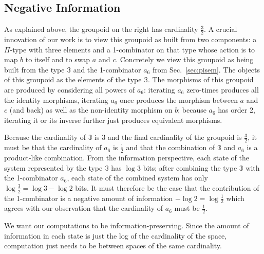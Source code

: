 \subsection{Negative Information}

As explained above, the groupoid on the right has cardinality
$\frac{3}{2}$. A crucial innovation of our work is to view this
groupoid as built from two components: a $\Pi$-type with three
elements and a 1-combinator on that type whose action is to map $b$ to
itself and to swap $a$ and $c$. Concretely we view this groupoid as
being built from the type $\mathbb{3}$ and the 1-combinator $a_6$ from
Sec.~\ref{sec:pisem}. The objects of this groupoid as the elements of
the type $\mathbb{3}$. The morphisms of this groupoid are produced by
considering all powers of $a_6$: iterating $a_6$ zero-times produces
all the identity morphisms, iterating $a_6$ once produces the morphism
between $a$ and $c$ (and back) as well as the non-identity morphism on
$b$; because $a_6$ has order 2, iterating it or its inverse further
just produces equivalent morphisms.

Because the cardinality of $\mathbb{3}$ is 3 and the final cardinality
of the groupoid is $\frac{3}{2}$, it must be that the cardinality of
$a_6$ is $\frac{1}{2}$ and that the combination of $\mathbb{3}$ and
$a_6$ is a product-like combination. From the information perspective,
each state of the system represented by the type $\mathbb{3}$ has
$\log 3$ bits; after combining the type $\mathbb{3}$ with the
1-combinator $a_6$, each state of the combined system has only
$\log \frac{3}{2} = \log 3 - \log 2$ bits. It must therefore be the
case that the contribution of the 1-combinator is a negative amount of
information $- \log 2 = \log \frac{1}{2}$ which agrees with our
observation that the cardinality of $a_6$ must be $\frac{1}{2}$.








We want our computations to be information-preserving. Since the
amount of information in each state is just the log of the cardinality
of the space, computation just needs to be between spaces of the same
cardinality. 

